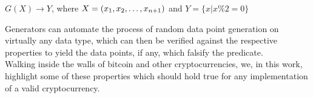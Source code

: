 \begin{center}
$G(X) \rightarrow {Y}$, where $X=\aDEFvector[x]{n+1}$ and $Y=\{x | x \% 2 = 0\}$
\end{center}
Generators can automate the process of random data point generation on virtually any data type, which can then be verified against the respective properties to yield the data points, if any, which falsify the predicate.\\

Walking inside the walls of bitcoin and other cryptocurrencies, we, in this work, highlight some of these properties which should hold true for any implementation of a valid cryptocurrency.